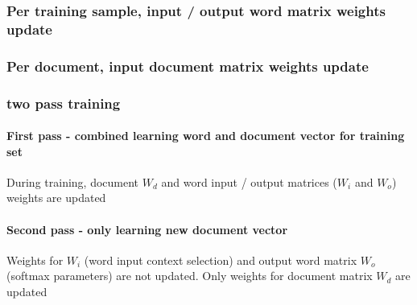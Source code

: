 \documentclass[a4paper]{article}
\begin{document}
\subsubsection{Per training sample, input / output word matrix weights update}

\subsubsection{Per document, input document matrix weights update}


\subsubsection{two pass training}

\paragraph{ First pass - combined learning word and document vector for training set}
During  training, document $W_{d}$ and word input / output matrices ($W_{i}$ and $W_{o}$) weights are updated

\paragraph{ Second pass - only learning new document vector}
Weights for $W_{i}$ (word input context selection) and output word matrix $W_{o}$ (softmax parameters) are not updated. Only weights for document matrix $W_{d}$ are updated



\end{document}
